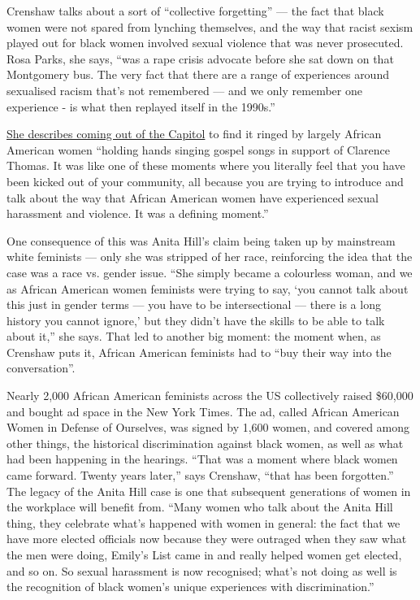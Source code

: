 \documentclass{article}
\begin{document}
Crenshaw talks about a sort of ``collective forgetting'' --- the fact that
black women were not spared from lynching themselves, and the way that racist
sexism played out for black women involved sexual violence that was never
prosecuted.  Rosa Parks, she says, ``was a rape crisis advocate before she sat
down on that Montgomery bus. The very fact that there are a range of
experiences around sexualised racism that's not remembered --- and we only
remember one experience - is what then replayed itself in the 1990s.''

\href{http://www.thenation.com/article/163814/black-women-still-defense-ourselves}{She
	describes coming out of the Capitol} to find it ringed by largely African
American women ``holding hands singing gospel songs in support of Clarence
Thomas. It was like one of these moments where you literally feel that you have
been kicked out of your community, all because you are trying to introduce and
talk about the way that African American women have experienced sexual
harassment and violence. It was a defining moment.''

One consequence of this was Anita Hill's claim being taken up by mainstream
white feminists --- only she was stripped of her race, reinforcing the idea
that the case was a race vs. gender issue. ``She simply became a colourless
woman, and we as African American women feminists were trying to say, `you
cannot talk about this just in gender terms --- you have to be intersectional
--- there is a long history you cannot ignore,' but they didn't have the skills
to be able to talk about it,'' she says. That led to another big moment: the
moment when, as Crenshaw puts it, African American feminists had to ``buy their
way into the conversation''.

Nearly 2,000 African American feminists across the US collectively raised
\$60,000 and bought ad space in the New York Times. The ad, called African
American Women in Defense of Ourselves, was signed by 1,600 women, and covered
among other things, the historical discrimination against black women, as well
as what had been happening in the hearings. ``That was a moment where black
women came forward. Twenty years later,'' says Crenshaw, ``that has been
forgotten.'' The legacy of the Anita Hill case is one that subsequent
generations of women in the workplace will benefit from. ``Many women who talk
about the Anita Hill thing, they celebrate what's happened with women in
general: the fact that we have more elected officials now because they were
outraged when they saw what the men were doing, Emily's List came in and really
helped women get elected, and so on. So sexual harassment is now recognised;
what's not doing as well is the recognition of black women's unique experiences
with discrimination.''
\end{document}
